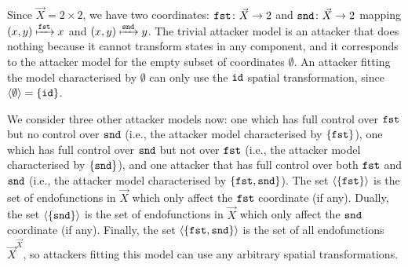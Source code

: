 \begin{example}
\label{ex:Latent:ExampleAttacker}
    Since $\vec{X}=2\times 2$, we have two coordinates: $\mathtt{\texttt{fst}}\colon \vec{X}\rightarrow 2$ and $\mathtt{\texttt{snd}}\colon \vec{X}\rightarrow 2$ mapping $(x,y)\xmapsto{\mathtt{\texttt{fst}}}x$ and $(x,y)\xmapsto{\mathtt{\texttt{snd}}}y$. The trivial attacker model is an attacker that does nothing because it cannot transform states in any component, and it corresponds to the attacker model for the empty subset of coordinates $\emptyset$. An attacker fitting the model characterised by $\emptyset$ can only use the ${\texttt{id}}$ spatial transformation, since ${{\left<\emptyset\right>}}=\left\{{\texttt{id}}\right\}$. 

    We consider three other attacker models now: one which has full control over $\mathtt{\texttt{fst}}$ but no control over $\mathtt{\texttt{snd}}$ (i.e., the attacker model characterised by $\left\{\mathtt{\texttt{fst}}\right\}$), one which has full control over $\mathtt{\texttt{snd}}$ but not over $\mathtt{\texttt{fst}}$ (i.e., the attacker model characterised by $\left\{\mathtt{\texttt{snd}}\right\}$), and one attacker that has full control over both $\mathtt{\texttt{fst}}$ and $\mathtt{\texttt{snd}}$ (i.e., the attacker model characterised by $\left\{\mathtt{\texttt{fst}}, \mathtt{\texttt{snd}}\right\}$). The set ${{\left<\left\{\mathtt{\texttt{fst}}\right\}\right>}}$ is the set of endofunctions in $\vec{X}$ which only affect the $\mathtt{\texttt{fst}}$ coordinate (if any).
    Dually, the set ${{\left<\left\{\mathtt{\texttt{snd}}\right\}\right>}}$ is the set of endofunctions in $\vec{X}$ which only affect the $\mathtt{\texttt{snd}}$ coordinate (if any). Finally, the set ${{\left<\left\{\mathtt{\texttt{fst}},\mathtt{\texttt{snd}}\right\}\right>}}$ is the set of all endofunctions $\vec{X}^{\vec{X}}$, so attackers fitting this model can use any arbitrary spatial transformations. 
    
    



\end{example}
